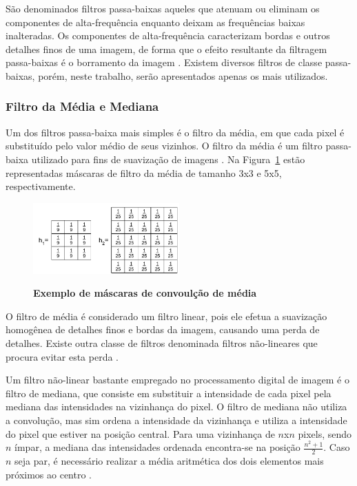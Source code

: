 \documentclass[12pt,oneside,a4paper,english,french,spanish,brazil,]{abntex2}
\begin{document}
São denominados filtros passa-baixas aqueles que atenuam ou eliminam os componentes de alta-frequência enquanto deixam as frequências baixas inalteradas. Os componentes de alta-frequência caracterizam bordas e outros detalhes finos de uma imagem, de forma que o efeito resultante da filtragem passa-baixas é o borramento da imagem \cite{gonzalez:2012}. Existem diversos filtros de classe passa-baixas, porém, neste trabalho, serão apresentados apenas os mais utilizados.

\subsubsection{Filtro da Média e Mediana}

Um dos filtros passa-baixa mais simples é o filtro da média, em que cada pixel é substituído pelo valor médio de seus vizinhos. O filtro da média é um filtro passa-baixa utilizado para fins de suavização de imagens \cite{pedrini:2008}. Na Figura~\ref{fig:PDI_Mascara_Media} estão representadas máscaras de filtro da média de tamanho 3x3 e 5x5, respectivamente.

\begin{figure}[ht]
\centering
\caption{\textbf{Exemplo de máscaras de convoulção de média}}
\includegraphics[width=0.5\textwidth]{imagens/PDI_Mascara_Media.pdf}
\label{fig:PDI_Mascara_Media}
\end{figure}

O filtro de média é considerado um filtro linear, pois ele efetua a suavização homogênea de detalhes finos e bordas da imagem, causando uma perda de detalhes. Existe outra classe de filtros denominada filtros não-lineares que procura evitar esta perda \cite{pedrini:2008}.

Um filtro não-linear bastante empregado no processamento digital de imagem é o filtro de mediana, que consiste em substituir a intensidade de cada pixel pela mediana das intensidades na vizinhança do pixel. O filtro de mediana não utiliza a convolução, mas sim ordena a intensidade da vizinhança e utiliza a intensidade do pixel que estiver na posição central. Para uma vizinhança de \(n\)x\(n\) pixels, sendo \(n\) ímpar, a mediana das intensidades ordenada encontra-se na posição \(\frac{n^2+1}{2}\). Caso \(n\) seja par, é necessário realizar a média aritmética dos dois elementos mais próximos ao centro \cite{gonzalez:2012}. 
\end{document}
